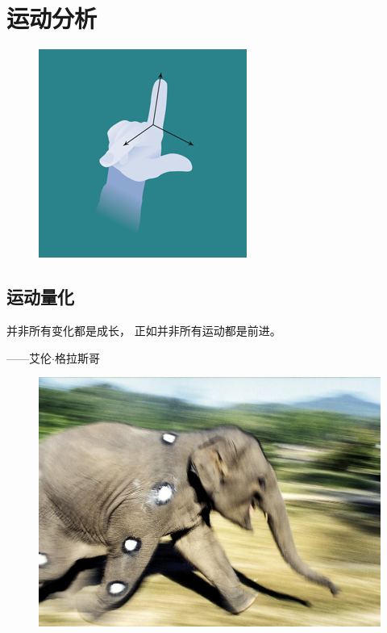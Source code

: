 \part{运动分析}

\begin{figure}[!htb]
	\centering
	\includegraphics[width=0.4\linewidth]{chap7/7_0_0}
	\caption*{ \label{fig:7_0_0}}
\end{figure}



\chapter{运动量化} \label{chap:chap7}


并非所有变化都是成长，
正如并非所有运动都是前进。
\begin{flushright}
	——艾伦$\cdot$格拉斯哥
\end{flushright}

\begin{figure}[!htb]
	\centering
	\includegraphics[width=1.0\linewidth]{chap7/7_0}
	\caption*{ \label{fig:7_0}}
\end{figure}

